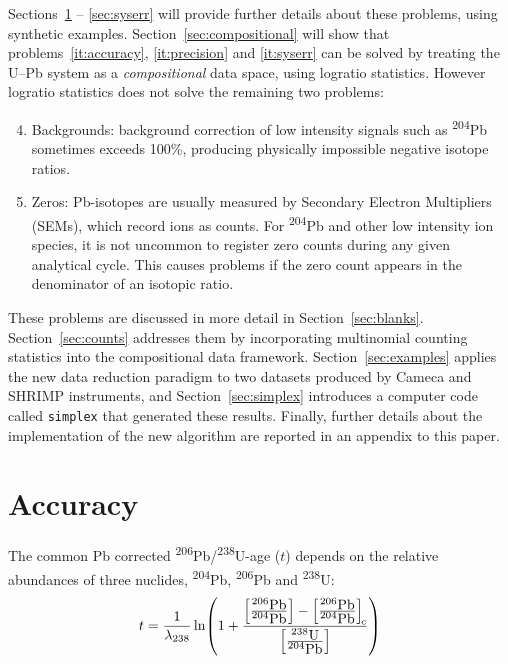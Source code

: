 \documentclass{article}
\begin{document}
Sections~\ref{sec:accuracy} -- \ref{sec:syserr} will provide further
details about these problems, using synthetic examples.
Section~\ref{sec:compositional} will show that
problems~\ref{it:accuracy}, \ref{it:precision} and \ref{it:syserr} can
be solved by treating the U--Pb system as a \emph{compositional} data
space, using logratio statistics. However logratio statistics does not
solve the remaining two problems:

\begin{enumerate}
  \setcounter{enumi}{3}
\item Backgrounds: background correction of low intensity signals such
  as \textsuperscript{204}Pb sometimes exceeds 100\%, producing
  physically impossible negative isotope ratios. \label{it:blanks}
\item Zeros: Pb-isotopes are usually measured by Secondary Electron
  Multipliers (SEMs), which record ions as counts. For
  \textsuperscript{204}Pb and other low intensity ion species, it is
  not uncommon to register zero counts during any given analytical
  cycle. This causes problems if the zero count appears in the
  denominator of an isotopic ratio. \label{it:zeros}
\end{enumerate}

These problems are discussed in more detail in
Section~\ref{sec:blanks}. Section~\ref{sec:counts} addresses them by
incorporating multinomial counting statistics into the compositional
data framework. Section~\ref{sec:examples} applies the new data
reduction paradigm to two datasets produced by Cameca and SHRIMP
instruments, and Section~\ref{sec:simplex} introduces a computer code
called \texttt{simplex} that generated these results. Finally, further
details about the implementation of the new algorithm are reported in
an appendix to this paper.

\section{Accuracy}\label{sec:accuracy}

The common Pb corrected
\textsuperscript{206}Pb/\textsuperscript{238}U-age ($t$) depends on
the relative abundances of three nuclides, \textsuperscript{204}Pb,
\textsuperscript{206}Pb and \textsuperscript{238}U:
\begin{equation}
  t = \frac{1}{\lambda_{238}}\ln\!\left( 1 + 
  \frac{
    \left[\frac{\mbox{\textsuperscript{206}Pb}}
      {\mbox{\textsuperscript{204}Pb}}\right] -
    \left[\frac{\mbox{\textsuperscript{206}Pb}}
      {\mbox{\textsuperscript{204}Pb}}\right]_{\!c}
  }{
    \left[\frac{\mbox{\textsuperscript{238}U}}
      {\mbox{\textsuperscript{204}Pb}}\right]
  }
  \right)
  \label{eq:tUPb}
\end{equation}
\end{document}
